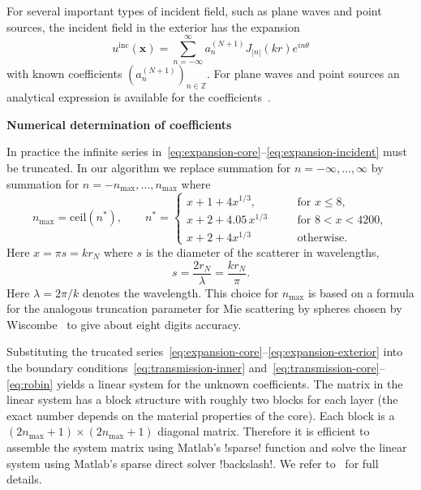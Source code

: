 \documentclass[11pt,letterpaper]{article}
\newcommand{\nmax}{n_\mathrm{max}}
\newcommand{\x}{\boldsymbol{x}}
\newcommand{\bbZ}{\mathbb{Z}}
\newcommand{\inc}{\mathrm{inc}}
\newcommand{\techheading}[1]{%
    \par\vspace{-0.3\parskip}\noindent\hspace{-1cm}\textbf{#1}%
    \par\vspace{-0.5\parskip}\noindent\nopagebreak\ignorespaces}
\begin{document}
For several important types of incident field, such as plane waves
and point sources, the incident field in the exterior has the expansion
\begin{equation}
  \label{eq:expansion-incident}
  u^\inc(\x) = 
  \sum_{n=-\infty}^\infty a^{(N+1)}_n J_{|n|}(k r) e^{i n \theta}
\end{equation}
with known coefficients $(a^{(N+1)}_n)_{n \in \bbZ}$.
For plane waves and point sources an analytical expression
is available for the coefficients~\cite[Equation~(8)]{mietoms}.

\techheading{Numerical determination of coefficients}
In practice the infinite series 
in~\eqref{eq:expansion-core}--\eqref{eq:expansion-incident}
must be truncated.
In our algorithm we replace summation for $n=-\infty,\dots,\infty$
by summation for $n = -\nmax,\dots,\nmax$ where
\begin{equation}
  \label{eq:wiscombe}
  \nmax = \mathrm{ceil} (n^*), \qquad
n^* = 
  \left\{ \begin{array}{lll}
  x + 1 + 4x^{1/3}, & \quad & \mbox{for $x \leq 8$},\\
  x + 2 + 4.05 \, x^{1/3} & \quad & \mbox{for $8<x<4200$},\\
  x + 2 + 4x^{1/3} & \quad & \mbox{otherwise}.
\end{array} \right.
\end{equation}
Here $x=\pi s = k r_N$ where $s$ is the diameter of the scatterer
in wavelengths,
\begin{equation}
  \label{eq:size}
  s = \frac{2r_{N}}{\lambda} = \frac{k r_N}{\pi}.
\end{equation}
Here $\lambda = 2\pi/k$ denotes the wavelength.
This choice for $\nmax$ is based on 
a formula for the analogous truncation parameter for
Mie scattering by spheres chosen by
Wiscombe~\cite{wiscombe:mie} to give about eight digits accuracy.

Substituting the trucated 
series~\eqref{eq:expansion-core}--\eqref{eq:expansion-exterior}
into the boundary 
conditions~\eqref{eq:transmission-inner}
and~\eqref{eq:transmission-core}--\eqref{eq:robin} yields
a linear system for the unknown coefficients.
The matrix in the linear system
has a block structure with roughly two blocks for each layer
(the exact number depends on the material properties of the core).
Each block is a $(2\nmax +1) \times (2 \nmax+1)$ diagonal matrix.
Therefore it is efficient to assemble the system matrix using Matlab's 
!sparse! function and solve the linear system using Matlab's sparse direct
solver !backslash!.
We refer to~\cite{mietoms} for full details.
\end{document}
